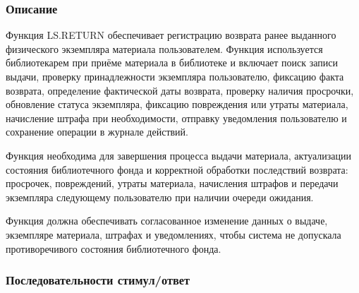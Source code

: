 \documentclass[12pt,a4paper]{article}
\begin{document}
	\subsubsection{Описание}
	
	Функция LS.RETURN обеспечивает регистрацию возврата ранее выданного
	физического экземпляра материала пользователем. Функция используется
	библиотекарем при приёме материала в библиотеке и включает поиск записи
	выдачи, проверку принадлежности экземпляра пользователю, фиксацию факта
	возврата, определение фактической даты возврата, проверку наличия просрочки,
	обновление статуса экземпляра, фиксацию повреждения или утраты материала,
	начисление штрафа при необходимости, отправку уведомления пользователю
	и сохранение операции в журнале действий.
	
	Функция необходима для завершения процесса выдачи материала, актуализации
	состояния библиотечного фонда и корректной обработки последствий возврата:
	просрочек, повреждений, утраты материала, начисления штрафов и передачи
	экземпляра следующему пользователю при наличии очереди ожидания.
	
	Функция должна обеспечивать согласованное изменение данных о выдаче,
	экземпляре материала, штрафах и уведомлениях, чтобы система не допускала
	противоречивого состояния библиотечного фонда.
	
	\subsubsection{Последовательности стимул/ответ}
	
\end{document}

